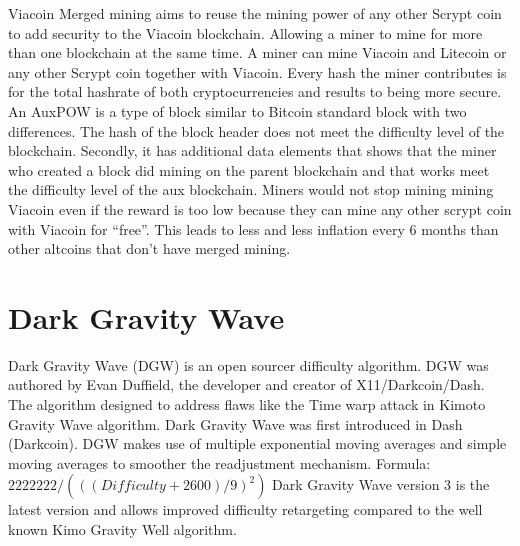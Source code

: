 \documentclass{article}
\begin{document}
Viacoin \cite{auxpow}Merged mining aims to reuse the mining power of any other \cite{scrypt}Scrypt coin
to add security to the Viacoin blockchain.
Allowing a miner to mine for more than one blockchain at the same time. A miner
can mine Viacoin and Litecoin or any other Scrypt coin together with Viacoin.
\newline \newline \noindent
Every hash the miner contributes is for the total hashrate of both
cryptocurrencies and results to being more secure.
An AuxPOW is a type of block similar to Bitcoin standard block with two
differences. The hash of the block header does not meet the difficulty level of the
blockchain. Secondly, it has additional data elements that shows that the miner
who created a block did mining on the parent blockchain and that works meet
the difficulty level of the aux blockchain. 
\newline \newline \noindent
Miners would not stop mining mining
Viacoin even if the reward is too low because they can mine any other scrypt
coin with Viacoin for “free”. This leads to less and less inflation every 6 months
than other altcoins that don’t have merged mining.
\newpage

\section{Dark Gravity Wave}\label{sec: Dark Gravity Wave}
\cite{darkGravityWave}Dark Gravity Wave (DGW) is an open sourcer difficulty algorithm. DGW was
authored by Evan Duffield, the developer and creator of X11/Darkcoin/Dash.
The algorithm designed to address flaws like the Time warp attack in Kimoto
Gravity Wave algorithm. 
\newline \newline \noindent
Dark Gravity Wave was first introduced in Dash
(Darkcoin). DGW makes use of multiple exponential moving averages and simple
moving averages to smoother the readjustment mechanism.
\newline Formula: \newline \newline
$2222222/ (((Difficulty+2600)/9)^2)$ \newline \newline \noindent
Dark Gravity Wave version 3 is the latest version and allows improved difficulty retargeting compared
to the well known Kimo Gravity Well algorithm.
\end{document}
